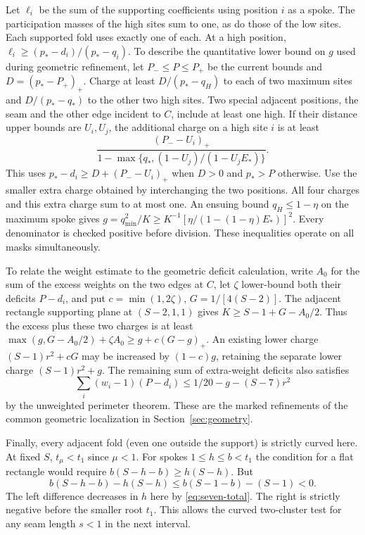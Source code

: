\documentclass[11pt,a4paper]{article}
\theoremstyle{definition}
\begin{document}
Let $\ell_i$ be the sum of the supporting coefficients using position
$i$ as a spoke. The participation masses of the high sites sum to one,
as do those of the low sites. Each supported fold uses exactly one of
each. At a high position,
$\ell_i\ge (p_*-d_i)/(p_*-q_i)$. To describe the quantitative
lower bound on $g$ used during geometric refinement, let
$P_-\le P\le P_+$ be the current bounds and $D=(p_*-P_+)_+$.
Charge at least $D/(p_*-q_H)$ to each of two maximum sites and
$D/(p_*-q_*)$ to the other two high sites. Two special adjacent positions,
the seam and the other edge incident to $C$, include at least one high.
If their distance upper bounds are $U_i,U_j$, the additional charge
on a high site $i$ is at least
\[
 \frac{(P_--U_i)_+}{1-\max\{q_*,(1-U_j)/(1-U_jE_*)\}} .
\]
This uses $p_*-d_i\ge D+(P_--U_i)_+$ when $D>0$ and $p_*>P$
otherwise. Use the smaller extra charge obtained by interchanging the
two positions. All four charges and this extra charge sum to at most
one. An ensuing bound $q_H\le1-\eta$ on the maximum spoke gives
$g=q_{\min}^2/K\ge K^{-1}[\eta/(1-(1-\eta)E_*)]^2$.
Every denominator is checked positive before division. These
inequalities operate on all masks simultaneously.

To relate the weight estimate to the geometric deficit calculation, write
$A_0$ for the sum of the excess weights on the two edges at $C$, let
$\zeta$ lower-bound both their deficits $P-d_i$, and put
$c=\min(1,2\zeta)$, $G=1/[4(S-2)]$. The adjacent rectangle supporting
plane at $(S-2,1,1)$ gives $K\ge S-1+G-A_0/2$.
Thus the excess plus these two charges is at least
$\max(g,G-A_0/2)+\zeta A_0\ge g+c(G-g)_+$. An existing lower
charge $(S-1)r^2+cG$ may be increased by $(1-c)g$, retaining the
separate lower charge $(S-1)r^2+g$.
The remaining sum of extra-weight deficits also satisfies
\[
 \sum_i(w_i-1)(P-d_i)\le 1/20-g-(S-7)r^2
\]
by the unweighted perimeter theorem. These are the marked refinements of
the common geometric localization in Section~\ref{sec:geometry}.

Finally, every adjacent fold (even one outside the support) is strictly
curved here. At fixed $S$, $t_\mu<t_1$ since $\mu<1$. For spokes
$1\le h\le b<t_1$ the condition for a flat rectangle would require
$b(S-h-b)\ge h(S-h)$. But
\[
 b(S-h-b)-h(S-h)\le b(S-1-b)-(S-1)<0 .
\]
The left difference decreases in $h$ here by \eqref{eq:seven-total}.
The right is strictly negative before the smaller root $t_1$. This
allows the curved two-cluster test for any seam length $s<1$ in the
next interval.
\end{document}
